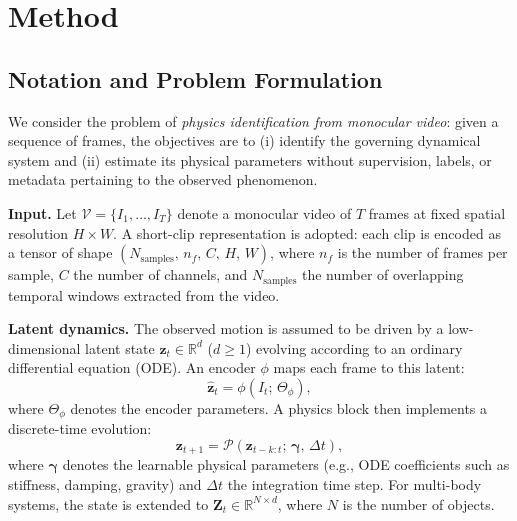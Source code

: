 \documentclass[runningheads]{llncs}
\begin{document}
\section{Method}
\label{sec:method}

\subsection{Notation and Problem Formulation}
\label{sec:notation}

We consider the problem of \emph{physics identification from monocular video}: 
given a sequence of frames, the objectives are to (i) identify the governing dynamical 
system and (ii) estimate its physical parameters without supervision, 
labels, or metadata pertaining to the observed phenomenon.

\textbf{Input.} Let $\mathcal{V} = \{I_1, \ldots, I_T\}$ denote a monocular 
video of $T$ frames at fixed spatial resolution $H \times W$. A 
short-clip representation is adopted: each clip is encoded as a tensor of shape 
$(N_{\mathrm{samples}},\, n_f,\, C,\, H,\, W)$, where $n_f$ is the number of 
frames per sample, $C$ the number of channels, and $N_{\mathrm{samples}}$ the 
number of overlapping temporal windows extracted from the video.

\textbf{Latent dynamics.} The observed motion is assumed to be driven by a 
low-dimensional latent state $\mathbf{z}_t \in \mathbb{R}^d$ ($d \geq 1$) 
evolving according to an ordinary differential equation (ODE). An encoder 
$\phi$ maps each frame to this latent:
%
\begin{equation}
    \hat{\mathbf{z}}_t = \phi(I_t;\, \Theta_\phi),
    \label{eq:encoder}
\end{equation}
%
where $\Theta_\phi$ denotes the encoder parameters. A physics block then 
implements a discrete-time evolution:
%
\begin{equation}
    \mathbf{z}_{t+1} = \mathcal{P}\!\left(\mathbf{z}_{t-k:t};\, 
    \boldsymbol{\gamma},\, \Delta t\right),
    \label{eq:physics_block}
\end{equation}
%
where $\boldsymbol{\gamma}$ denotes the learnable physical parameters 
(e.g., ODE coefficients such as stiffness, damping, gravity) and $\Delta t$ 
the integration time step. For multi-body systems, the state is extended to 
$\mathbf{Z}_t \in \mathbb{R}^{N \times d}$, where $N$ is the number of objects.
\end{document}
